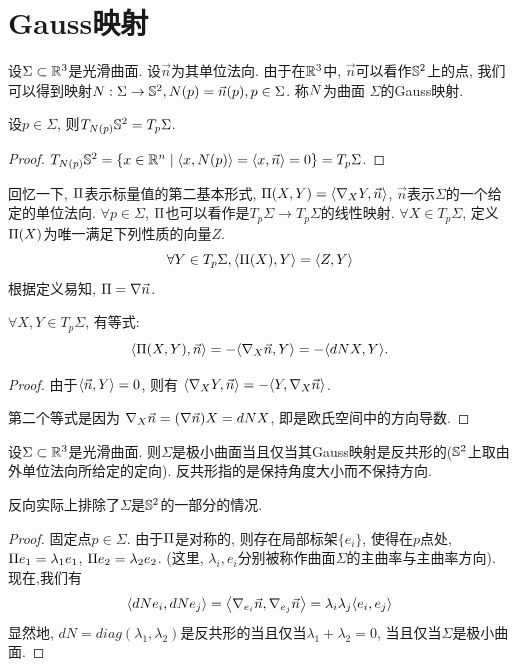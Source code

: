 \section{Gauss映射}
设$\Sigma \subset \R^3$是光滑曲面. 设$\vec{n}$为其单位法向. 由于在$\R^3$中, $\vec{n}$可以看作$\S^2$上的点, 我们可以得到映射$\N:\Sigma \to  \S^2, \N(p)=\vec{n}(p), p \in \Sigma$. 称$\N$为曲面 $\Sigma$的Gauss映射.
\begin{proposition}
    设$p \in \Sigma$, 则$T_{\N(p)}\S^2= T_p\Sigma$.
\end{proposition}
\begin{proof}
    $T_{\N(p)}\S^2=\{x\in \R^n\mid \inner{x}{\N(p)}=\inner{x}{\vec{n}}=0\}=T_p\Sigma$.
\end{proof}
回忆一下, $\II$表示标量值的第二基本形式, $\II(X,Y)=\inner{\nabla_XY}{\vec{n}}$, $\vec{n}$表示$\Sigma$的一个给定的单位法向. $\forall p \in \Sigma$, $\II$也可以看作是$T_p\Sigma \to T_p \Sigma$的线性映射.  $\forall X \in T_p\Sigma$, 定义$\II(X)$为唯一满足下列性质的向量$Z$.
\begin{equation}
    \forall Y \in T_p\Sigma, \inner{\II(X)}{Y}=\inner{Z}{Y}
\end{equation}
根据定义易知, $\II= \nabla \vec{n}$.
\begin{proposition}
    $\forall X, Y \in T_p\Sigma$, 有等式: 
    \begin{equation}
        \inner{\II(X,Y)}{\vec{n}}=-\inner{\nabla_X\vec{n}}{Y}=-\inner{d\N X}{Y}.
    \end{equation}
\end{proposition}
\begin{proof}
    由于$\inner{\vec{n}}{Y}=0$, 则有 $\inner{\nabla_XY}{\vec{n}}=-\inner{Y}{\nabla_X\vec{n}}$. 
    \par 第二个等式是因为 $\nabla_X\vec{n}=(\nabla \vec{n})X=d\N X$, 即是欧氏空间中的方向导数.
\end{proof}
\begin{proposition} \label{gauss_anticonformal}
    设$\Sigma \subset \R^3$是光滑曲面. 则$\Sigma$是极小曲面当且仅当其Gauss映射是反共形的($\S^2$上取由外单位法向所给定的定向). 反共形指的是保持角度大小而不保持方向.
\end{proposition}
\begin{remark}
    反向实际上排除了$\Sigma$是$\S^2$的一部分的情况.  
\end{remark}
\begin{proof}
    固定点$p \in \Sigma$. 由于$\II$是对称的, 则存在局部标架$\{e_i\}$, 使得在$p$点处, $\II e_1=\lambda_1 e_1$, $\II e_2=\lambda_2 e_2$. (这里, $\lambda_i,e_i$分别被称作曲面$\Sigma$的主曲率与主曲率方向). 现在,我们有
    \begin{equation}
        \inner{d\N e_i}{d\N e_j}= \inner{\nabla_{e_i}\vec{n}}{\nabla_{e_j}\vec{n}} =\lambda_i\lambda_j\inner{e_i}{e_j}
    \end{equation}
    显然地,  $dN=diag(\lambda_1,\lambda_2)$是反共形的当且仅当$\lambda_1+\lambda_2=0$, 当且仅当$\Sigma$是极小曲面.
\end{proof}
